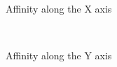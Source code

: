 \begin{figure}[!htbp]
    \centering
    \begin{subfigure}[t]{0.31\textwidth}
        \centering
        \caption{Affinity along the X axis}
    \end{subfigure}%
    ~ 
    \begin{subfigure}[t]{0.31\textwidth}
        \centering
        \caption{Affinity along the Y axis}
    \end{subfigure}
    ~ 
    \begin{subfigure}[t]{0.31\textwidth}
        \centering

\end{subfigure}
\end{figure}
